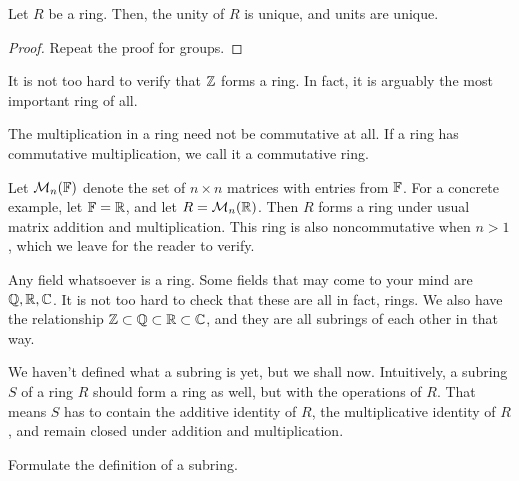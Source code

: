 \documentclass[./main.tex]{subfiles}
\begin{document}
\begin{proposition}
    Let $R$ be a ring. Then, the unity of $R$ is unique, and units are unique.
\end{proposition}
\begin{proof}
    Repeat the proof for groups.
\end{proof}

\begin{example}
    It is not too hard to verify that $\mathbb{Z}$ forms a ring. In fact, it is
    arguably the most important ring of all.
\end{example}

The multiplication in a ring need not be commutative at all. If a ring has
commutative multiplication, we call it a commutative ring.
\begin{example}
    Let $\mathcal{M}_n(\mathbb{F})$ denote the set of $n \times n$ matrices with entries
    from $\mathbb{F}$. For a concrete example, let $\mathbb{F} = \mathbb{R}$, and let $R = \mathcal{M}_n(\mathbb{R})$. Then $R$ forms a ring under usual matrix addition and
    multiplication. This ring is also noncommutative when $n > 1$, which we
    leave for the reader to verify.
\end{example}

\begin{example}
    Any field whatsoever is a ring. Some fields that may come to your mind are
    $\mathbb{Q}, \mathbb{R}, \mathbb{C}$. It is not too hard to check that these are all in fact,
    rings. We also have the relationship $\mathbb{Z} \subset \mathbb{Q} \subset \mathbb{R} \subset
    \mathbb{C}$, and they are all subrings of each other in that way.
\end{example}

We haven't defined what a subring is yet, but we shall now. Intuitively, a
subring $S$ of a ring $R$ should form a ring as well, but with the operations of
$R$. That means $S$ has to contain the additive identity of $R$, the
multiplicative identity of $R$, and remain closed under addition and
multiplication.
\begin{exercise}
    Formulate the definition of a subring.
\end{exercise}
\end{document}
